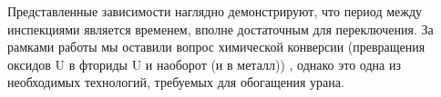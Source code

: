 Представленные зависимости наглядно демонстрируют, что период между инспекциями является временем, вполне достаточным для переключения. За рамками работы мы оставили вопрос химической конверсии (превращения оксидов U в фториды U и наоборот (и в металл)) \cite{orlovDesublimationPurificationTransporting2017}, однако это одна из необходимых технологий, требуемых для обогащения урана. 



